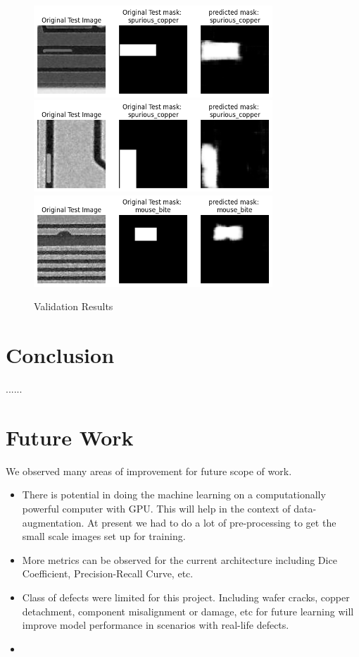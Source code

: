 \documentclass[12pt]{article}
\begin{document}
\begin{figure}[h]
    \centering
    \includegraphics[width=0.8\textwidth]{./graphics/output4.png}
    \includegraphics[width=0.8\textwidth]{./graphics/output5.png}
    \includegraphics[width=0.8\textwidth]{./graphics/output6.png}
    \caption{Validation Results}
    \label{fig:results}
\end{figure}

\clearpage
\newpage

\section{Conclusion}
......

\clearpage
\newpage

\section{Future Work}
We observed many areas of improvement for future scope of work. 
\begin{itemize}
    \item There is potential in doing the machine learning on a computationally powerful computer with GPU. This will help in the context of data-augmentation. At present we had to do a lot of pre-processing to get the small scale images set up for training.
    \item More metrics can be observed for the current architecture including Dice Coefficient, Precision-Recall Curve, etc.  
    \item Class of defects were limited for this project. Including wafer cracks, copper detachment, component misalignment or damage, etc for future learning will improve model performance in scenarios with real-life defects.
    \item 
\end{itemize}
\clearpage
\newpage
\end{document}
